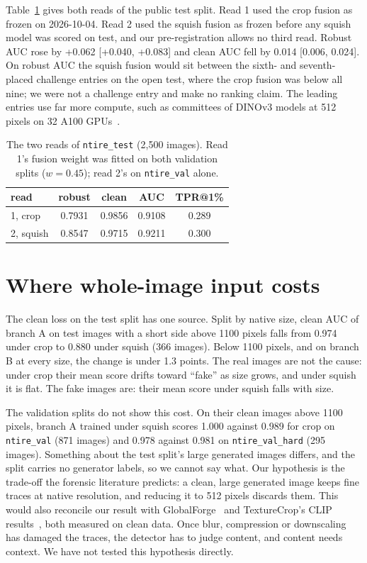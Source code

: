 \documentclass[10pt,twocolumn,letterpaper]{article}
\begin{document}
Table~\ref{tab:test} gives both reads of the public test split. Read 1 used the
crop fusion as frozen on 2026-10-04. Read 2 used the squish fusion as frozen
before any squish model was scored on test, and our pre-registration allows no
third read. Robust AUC rose by +0.062 [+0.040, +0.083] and clean AUC fell by
0.014 [0.006, 0.024]. On robust AUC the squish fusion would sit between the
sixth- and seventh-placed challenge entries on the open test, where the crop
fusion was below all nine; we were not a challenge entry and make no ranking
claim. The leading entries use far more compute, such as committees of DINOv3
models at 512 pixels on 32 A100 GPUs~\cite{gushchin2026ntire}.

\begin{table}[t]
\centering
\small
\begin{tabular}{lcccc}
\toprule
read & robust & clean & AUC & TPR@1\% \\
\midrule
1, crop & 0.7931 & 0.9856 & 0.9108 & 0.289 \\
2, squish & 0.8547 & 0.9715 & 0.9211 & 0.300 \\
\bottomrule
\end{tabular}
\caption{The two reads of \texttt{ntire\_test} (2,500 images). Read 1's fusion
weight was fitted on both validation splits ($w = 0.45$); read 2's on
\texttt{ntire\_val} alone.}
\label{tab:test}
\end{table}

\section{Where whole-image input costs}
\label{sec:cost}

The clean loss on the test split has one source. Split by native size, clean
AUC of branch A on test images with a short side above 1100 pixels falls from
0.974 under crop to 0.880 under squish (366 images). Below 1100 pixels, and on
branch B at every size, the change is under 1.3 points. The real images are not
the cause: under crop their mean score drifts toward ``fake'' as size grows,
and under squish it is flat. The fake images are: their mean score under
squish falls with size.

The validation splits do not show this cost. On their clean images above
1100 pixels, branch A trained under squish scores 1.000 against 0.989 for
crop on \texttt{ntire\_val} (871 images) and 0.978 against 0.981 on
\texttt{ntire\_val\_hard} (295 images). Something about the test split's large
generated images differs, and the split carries no generator labels, so we
cannot say what. Our hypothesis is the trade-off the forensic literature
predicts: a clean, large generated image keeps fine traces at native
resolution, and reducing it to 512 pixels discards them. This would also
reconcile our result with GlobalForge~\cite{cui2026globalforge} and
TextureCrop's CLIP results~\cite{konstantinidou2025texturecrop}, both measured
on clean data. Once blur, compression or downscaling has damaged the traces,
the detector has to judge content, and content needs context. We have not
tested this hypothesis directly.
\end{document}
